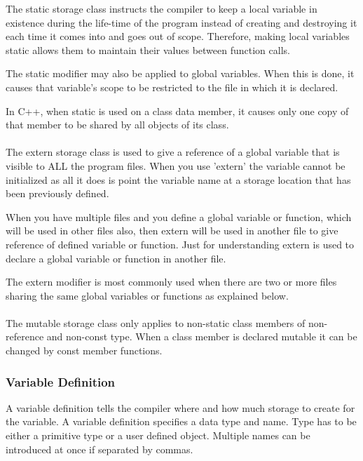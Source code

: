 \documentclass[10pt,a4paper]{scrartcl}
\begin{document}
\begin{multicols*}{2}
The static storage class instructs the compiler to keep a local variable in existence during the life-time of the program instead of creating and destroying it each time it comes into and goes out of scope. Therefore, making local variables static allows them to maintain their values between function calls.

The static modifier may also be applied to global variables. When this is done, it causes that variable's scope to be restricted to the file in which it is declared.

In C++, when static is used on a class data member, it causes only one copy of that member to be shared by all objects of its class.

\paragraph{}

The extern storage class is used to give a reference of a global variable that is visible to ALL the program files. When you use 'extern' the variable cannot be initialized as all it does is point the variable name at a storage location that has been previously defined.

When you have multiple files and you define a global variable or function, which will be used in other files also, then extern will be used in another file to give reference of defined variable or function. Just for understanding extern is used to declare a global variable or function in another file.

The extern modifier is most commonly used when there are two or more files sharing the same global variables or functions as explained below.

\paragraph{}

The mutable storage class only applies to non-static class members of non-reference and non-const type. When a class member is declared mutable it can be changed by const member functions.

\subsubsection{Variable Definition}

A variable definition tells the compiler where and how much storage to create for the variable. A variable definition specifies a data type and name. Type has to be either a primitive type or a user defined object. Multiple names can be introduced at once if separated by commas.


\end{multicols*}
\end{document}
